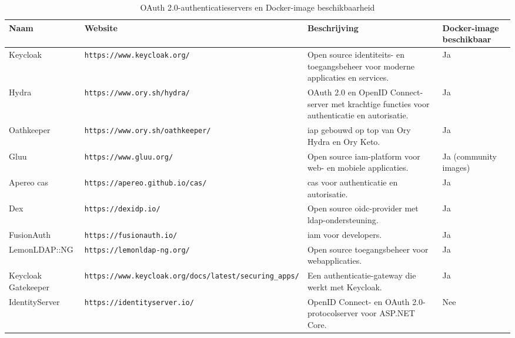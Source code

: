 \begin{table}[htbp]
  \centering
  \caption{OAuth 2.0-authenticatieservers en Docker-image beschikbaarheid}
  \label{tab:oauth_servers}
  \begin{adjustbox}{width=1\textwidth}
  \begin{tabular}{@{}llll@{}}
    \toprule
    Naam          & Website                               & Beschrijving                                                                   & Docker-image beschikbaar \\ \midrule
    Keycloak      & \texttt{https://www.keycloak.org/}     & Open source identiteits- en toegangsbeheer voor moderne applicaties en services. & Ja                        \\
    Hydra         & \texttt{https://www.ory.sh/hydra/}     & OAuth 2.0 en OpenID Connect-server met krachtige functies voor authenticatie en autorisatie. & Ja                        \\
    Oathkeeper & \texttt{https://www.ory.sh/oathkeeper/} & \gls{iap} gebouwd op top van Ory Hydra en Ory Keto. & Ja                        \\
    Gluu          & \texttt{https://www.gluu.org/}         & Open source \gls{iam}-platform voor web- en mobiele applicaties.                   & Ja (community images)    \\
    Apereo \gls{cas}    & \texttt{https://apereo.github.io/cas/} & \gls{cas} voor authenticatie en autorisatie.      & Ja                        \\
    Dex           & \texttt{https://dexidp.io/}            & Open source \gls{oidc}-provider met \gls{ldap}-ondersteuning.                             & Ja                        \\
    FusionAuth    & \texttt{https://fusionauth.io/}        & \gls{iam} voor developers.                               & Ja                        \\
    LemonLDAP::NG & \texttt{https://lemonldap-ng.org/}     & Open source toegangsbeheer voor webapplicaties.                               & Ja                        \\
    Keycloak Gatekeeper & \texttt{https://www.keycloak.org/docs/latest/securing\_apps/} & Een authenticatie-gateway die werkt met Keycloak.                     & Ja                        \\
    IdentityServer & \texttt{https://identityserver.io/}    & OpenID Connect- en OAuth 2.0-protocolserver voor ASP.NET Core.               & Nee                       \\

\end{tabular}
\end{adjustbox}
\end{table}
